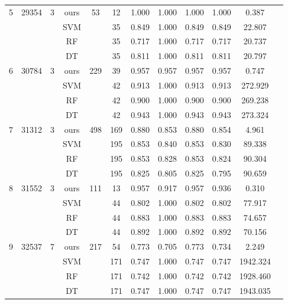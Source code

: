 \begin{table}[htbp]
\begin{tabular}{cccccccccccc}
        \midrule
        5  & 29354 & 3 & ours & 53  & 12  & 1.000 & 1.000 & 1.000 & 1.000 & 0.387 \\
           &       &   & SVM  &     & 35  & 0.849 & 1.000 & 0.849 & 0.849 & 22.807 \\
           &       &   & RF   &     & 35  & 0.717 & 1.000 & 0.717 & 0.717 & 20.737 \\
           &       &   & DT   &     & 35  & 0.811 & 1.000 & 0.811 & 0.811 & 20.797 \\
        \midrule
        6  & 30784 & 3 & ours & 229 & 39  & 0.957 & 0.957 & 0.957 & 0.957 & 0.747 \\
           &       &   & SVM  &     & 42  & 0.913 & 1.000 & 0.913 & 0.913 & 272.929 \\
           &       &   & RF   &     & 42  & 0.900 & 1.000 & 0.900 & 0.900 & 269.238 \\
           &       &   & DT   &     & 42  & 0.943 & 1.000 & 0.943 & 0.943 & 273.324 \\
        \midrule
        7  & 31312 & 3 & ours & 498 & 169 & 0.880 & 0.853 & 0.880 & 0.854 & 4.961 \\
           &       &   & SVM  &     & 195 & 0.853 & 0.840 & 0.853 & 0.830 & 89.338 \\
           &       &   & RF   &     & 195 & 0.853 & 0.828 & 0.853 & 0.824 & 90.304 \\
           &       &   & DT   &     & 195 & 0.825 & 0.805 & 0.825 & 0.795 & 90.659 \\
       \midrule
        8  & 31552 & 3 & ours & 111 & 13  & 0.957 & 0.917 & 0.957 & 0.936 & 0.310 \\
           &       &   & SVM  &     & 44  & 0.802 & 1.000 & 0.802 & 0.802 & 77.917 \\
           &       &   & RF   &     & 44  & 0.883 & 1.000 & 0.883 & 0.883 & 74.657 \\
           &       &   & DT   &     & 44  & 0.892 & 1.000 & 0.892 & 0.892 & 70.156 \\
        \midrule
        9  & 32537 & 7 & ours & 217 & 54  & 0.773 & 0.705 & 0.773 & 0.734 & 2.249 \\
           &       &   & SVM  &     & 171 & 0.747 & 1.000 & 0.747 & 0.747 & 1942.324 \\
           &       &   & RF   &     & 171 & 0.742 & 1.000 & 0.742 & 0.742 & 1928.460 \\
           &       &   & DT   &     & 171 & 0.747 & 1.000 & 0.747 & 0.747 & 1943.035 \\

\end{tabular}
\end{table}
